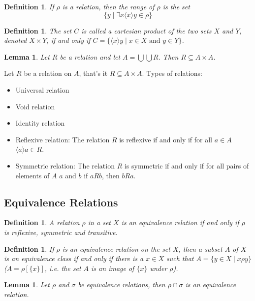 \documentclass[letterpaper, 10pt]{article}
\newtheorem{lem}[thm]{Lemma}
\newtheorem{define}[thm]{Definition}
\newcommand{\set}[1]{\{#1\}}
\newcommand{\tuple}[1]{\langle #1\rangle}
\begin{document}
	\begin{define}
	If $\rho$ is a relation, then the range of $\rho$ is the set
	$$
	\set{y \mid \exists x \tuple{x}{y} \in \rho}
	$$
	\end{define}


	\begin{define}
		The set $C$ is called a cartesian product of the
		two sets $X$ and $Y$, denoted $X\times Y$,
		if and only if
		$C = \set{\tuple{x}{y}\mid x\in X \text{ and } y\in Y}$.
	\end{define}

	\begin{lem}
		Let $R$ be a relation and let $A = \bigcup\bigcup R$. Then $R\subseteq
		A \times A$.
	\end{lem}

	Let $R$ be a relation on $A$, that's it $R\subseteq A\times A$.
	Types of relations:
	\begin{itemize}
		\item Universal relation
		\item Void relation
		\item Identity relation
		\item Reflexive relation: The relation $R$ is reflexive if and only if
			for all $a\in A$ $\tuple{a}{a}\in R$.
		\item Symmetric relation: The relation $R$ is symmetric if and only if
			for all pairs of elements of $A$ $a$ and $b$ if $aRb$, then $bRa$. 
	\end{itemize}

	\subsection{Equivalence Relations}

	\begin{define}
		A relation $\rho$ in a set $X$ is an equivalence relation if and only if
		$\rho$ is reflexive, symmetric and transitive.
	\end{define}
	
	\begin{define}
		If $\rho$ is an equivalence relation on the set $X$, then a subset $A$
		of $X$ is an equivalence class if and only if there is a $x \in X$ such
		that $A = \set{y\in X\mid x\rho y }$ ($A = \rho[\set{x}]$, i.e. the
		set $A$ is an image of $\set{x}$ under $\rho$).
	\end{define}

	\begin{lem}
		Let $\rho$ and $\sigma$ be equivalence relations, then $\rho \cap
		\sigma$ is an equivalence relation.
	\end{lem}
\end{document}
